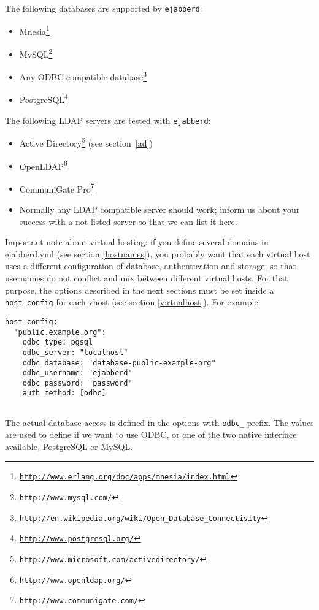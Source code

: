 \documentclass[a4paper,10pt]{book}
\newcommand{\ind}[1]{\begin{latexonly}\index{#1}\end{latexonly}}
\newcommand{\makesubsection}[2]{ \aname{#1}{} \subsection{\ahrefloc{#1}{#2}} \label{#1} }
\newcommand{\term}[1]{\texttt{#1}}
\newcommand{\ejabberd}{\texttt{ejabberd}}
\gdef\footahref#1#2{#2\footnote{\href{#1}{\texttt{#1}}}}
\begin{document}
The following databases are supported by \ejabberd{}:
\begin{itemize}
\item \footahref{http://www.erlang.org/doc/apps/mnesia/index.html}{Mnesia}
\item \footahref{http://www.mysql.com/}{MySQL}
\item \footahref{http://en.wikipedia.org/wiki/Open\_Database\_Connectivity}{Any ODBC compatible database}
\item \footahref{http://www.postgresql.org/}{PostgreSQL}
\end{itemize}

The following LDAP servers are tested with \ejabberd{}:
\begin{itemize}
\item \footahref{http://www.microsoft.com/activedirectory/}{Active Directory}
  (see section~\ref{ad})
\item \footahref{http://www.openldap.org/}{OpenLDAP}
\item \footahref{http://www.communigate.com/}{CommuniGate Pro}
\item Normally any LDAP compatible server should work; inform us about your
  success with a not-listed server so that we can list it here.
\end{itemize}

Important note about virtual hosting:
if you define several domains in ejabberd.yml (see section \ref{hostnames}),
you probably want that each virtual host uses a different configuration of database, authentication and storage,
so that usernames do not conflict and mix between different virtual hosts.
For that purpose, the options described in the next sections
must be set inside a \term{host\_config} for each vhost (see section \ref{virtualhost}).
For example:
\begin{verbatim}
host_config:
  "public.example.org":
    odbc_type: pgsql
    odbc_server: "localhost"
    odbc_database: "database-public-example-org"
    odbc_username: "ejabberd"
    odbc_password: "password"
    auth_method: [odbc]
\end{verbatim}


\makesubsection{odbc}{ODBC}\ind{odbc}

The actual database access is defined in the options with \term{odbc\_} prefix. The
values are used to define if we want to use ODBC, or one of the two native
interface available, PostgreSQL or MySQL.
\end{document}
